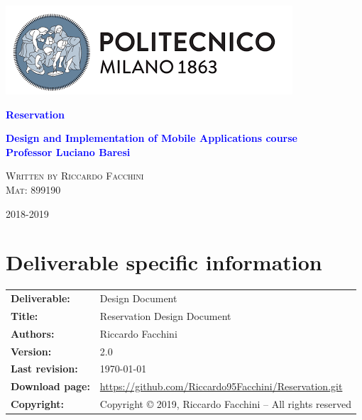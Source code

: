 

\begin{titlepage}
\centering
\includegraphics[scale=0.75]{Img/PolimiLogo}
\par\vspace{6cm}
{\textcolor{Blue}{\textbf{{\Huge Reservation}}}}
\par\vspace{1cm}
{\textcolor{Blue}{\textbf{{\Large Design and Implementation of Mobile Applications course \\ Professor Luciano Baresi}}}}
\par\vspace{3cm}
{\Large\scshape{Written by Riccardo Facchini \\Mat: 899190}}
\par\vfill
{\large 2018-2019}
\end{titlepage}
\clearpage
\section*{Deliverable specific information}
\begin{tabular}{ll}
\hline
\textbf{Deliverable:} & Design Document\\
\textbf{Title:} & Reservation Design Document \\
\textbf{Authors:} & Riccardo Facchini \\
\textbf{Version:} & 2.0 \\ 
\textbf{Last revision:} & \today \\
\textbf{Download page:} & \url{https://github.com/Riccardo95Facchini/Reservation.git} \\
\textbf{Copyright:} & Copyright © 2019, Riccardo Facchini – All rights reserved \\
\hline
\end{tabular}
\setcounter{page}{1}

